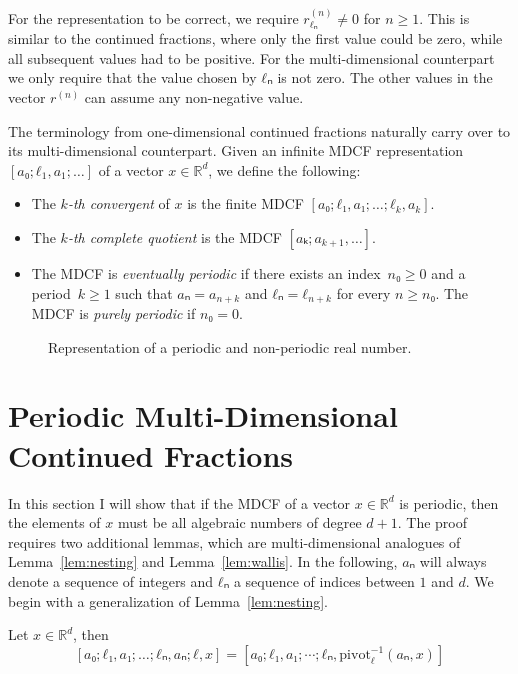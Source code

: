 For the representation to be correct, we require $r_{ℓₙ}^{(n)} ≠ 0$ for $n ≥ 1$.
This is similar to the continued fractions, where only the first value could be zero,
while all subsequent values had to be positive.
For the multi-dimensional counterpart we only require that the value chosen by
$ℓₙ$ is not zero.
The other values in the vector $r^{(n)}$ can assume any non-negative value.

The terminology from one-dimensional continued fractions naturally carry over to its
multi-dimensional counterpart.
Given an infinite MDCF representation~$[a₀; ℓ_1, a_1; …]$ of a vector $x ∈ ℝ^d$, we define the following:

\begin{itemize}
  \item The \emph{$k$-th convergent} of $x$ is the finite MDCF $[a₀; ℓ₁, a₁; …; ℓ_k, a_k]$.
  \item The \emph{$k$-th complete quotient} is the MDCF $[aₖ; a_{k+1}, …]$.
  \item The MDCF is \emph{eventually periodic} if there exists an index~$n₀ ≥ 0$
    and a period~$k ≥ 1$ such that $aₙ = a_{n+k}$ and $ℓₙ = ℓ_{n+k}$
    for every $n ≥ n₀$.
    The MDCF is \emph{purely periodic} if $n₀ = 0$.
\end{itemize}

\begin{figure}[tb]
  \centering
  
  \caption{
    Representation of a periodic and non-periodic real number.
  }
\end{figure}

\section{Periodic Multi-Dimensional Continued Fractions}

In this section I will show that if the MDCF of a vector $x ∈ ℝ^d$ is periodic,
then the elements of $x$ must be all algebraic numbers of degree $d+1$.
The proof requires two additional lemmas, which are multi-dimensional analogues
of Lemma~\ref{lem:nesting} and Lemma~\ref{lem:wallis}.
In the following, $aₙ$ will always denote a sequence of integers and $ℓₙ$ a
sequence of indices between $1$ and $d$.
We begin with a generalization of Lemma~\ref{lem:nesting}.

\begin{lemma}[Nesting]
  \label{lem:mdcf-nesting}
  Let $x ∈ ℝ^d$, then
  \[
    [a₀; ℓ₁, a₁; …; ℓₙ, aₙ; ℓ, x]
    = [a₀; ℓ₁, a₁; \cdots; ℓₙ, \mathrm{pivot}_{ℓ}^{-1}(aₙ, x)]
  \]
\end{lemma}

